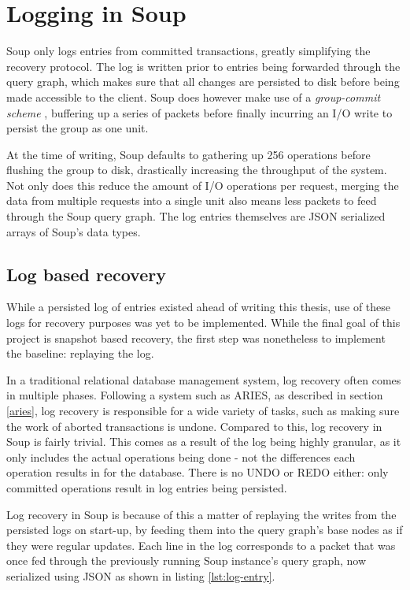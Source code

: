 \documentclass[b5paper]{report}
\begin{document}
\section{Logging in Soup}
Soup only logs entries from committed transactions, greatly simplifying the
recovery protocol. The log is written prior to entries being forwarded
through the query graph, which makes sure that all changes are persisted to disk
before being made accessible to the client. Soup does however make use of a
\textit{group-commit scheme} \cite{main-memory}, buffering up a series of
packets before finally incurring an I/O write to persist the group as one unit.

At the time of writing, Soup defaults to gathering up 256 operations before
flushing the group to disk, drastically increasing the throughput of the system.
Not only does this reduce the amount of I/O operations per request, merging the
data from multiple requests into a single unit also means less packets to feed
through the Soup query graph. The log entries themselves are JSON \cite{json}
serialized arrays of Soup's data types.

\subsection{Log based recovery}
While a persisted log of entries existed ahead of writing this thesis, use of
these logs for recovery purposes was yet to be implemented. While the final goal
of this project is snapshot based recovery, the first step was nonetheless to
implement the baseline: replaying the log.

In a traditional relational database management system, log recovery often comes
in multiple phases. Following a system such as ARIES, as described in section
\ref{aries}, log recovery is responsible for a wide variety of tasks, such as
making sure the work of aborted transactions is undone. Compared to this, log
recovery in Soup is fairly trivial. This comes as a result of the log being
highly granular, as it only includes the actual operations being done - not the
differences each operation results in for the database. There is no UNDO or REDO
either: only committed operations result in log entries being persisted.

Log recovery in Soup is because of this a matter of replaying the writes from
the persisted logs on start-up, by feeding them into the query graph's base
nodes as if they were regular updates. Each line in the log corresponds to a
packet that was once fed through the previously running Soup instance's query
graph, now serialized using JSON as shown in listing \ref{lst:log-entry}.
\end{document}
